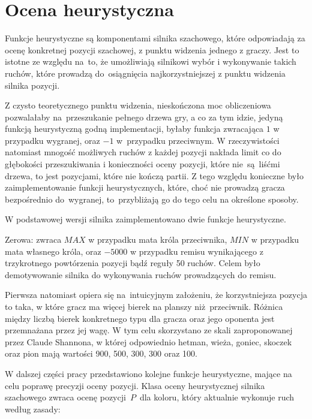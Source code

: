 \section{Ocena heurystyczna}
\label{sec:ocena-heurystyczna}

Funkcje heurystyczne są komponentami silnika szachowego, które odpowiadają za ocenę konkretnej pozycji szachowej, z punktu widzenia jednego z graczy.
Jest to istotne ze względu na~to, że umożliwiają silnikowi wybór i wykonywanie takich ruchów, które prowadzą do~osiągnięcia najkorzystniejszej z punktu widzenia silnika pozycji.

Z czysto teoretycznego punktu widzenia, nieskończona moc obliczeniowa pozwalałaby na~przeszukanie pełnego drzewa gry, a co za tym idzie, jedyną funkcją heurystyczną godną implementacji, byłaby funkcja zwracająca $1$ w przypadku wygranej, oraz $-1$ w~przypadku przeciwnym.
W rzeczywistości natomiast mnogość możliwych ruchów z każdej pozycji nakłada limit co do głębokości przeszukiwania i konieczności oceny pozycji, które nie~są~liśćmi drzewa, to jest pozycjami, które nie kończą partii.
Z tego względu konieczne było zaimplementowanie funkcji heurystycznych, które, choć nie prowadzą gracza bezpośrednio do~wygranej, to~przybliżają go do tego celu na określone sposoby.

W podstawowej wersji silnika zaimplementowano dwie funkcje heurystyczne.

Zerowa: zwraca $MAX$ w przypadku mata króla przeciwnika, $MIN$ w przypadku mata własnego króla, oraz $-5000$ w przypadku remisu wynikającego z trzykrotnego powtórzenia pozycji bądź reguły 50 ruchów.
Celem było demotywowanie silnika do wykonywania ruchów prowadzących do remisu.

Pierwsza natomiast opiera się na~intuicyjnym założeniu, że korzystniejsza pozycja to taka, w które gracz ma więcej bierek na planszy niż~przeciwnik.
Różnica między liczbą bierek konkretnego typu dla gracza oraz jego oponenta jest przemnażana przez jej wagę.
W tym celu skorzystano ze skali zaproponowanej przez Claude Shannona, w której odpowiednio hetman, wieża, goniec, skoczek oraz pion mają wartości 900, 500, 300, 300 oraz 100.

W dalszej części pracy przedstawiono kolejne funkcje heurystyczne, mające na celu poprawę precyzji oceny pozycji.
Klasa oceny heurystycznej silnika szachowego zwraca ocenę pozycji~$P$~dla koloru, który aktualnie wykonuje ruch według zasady:

